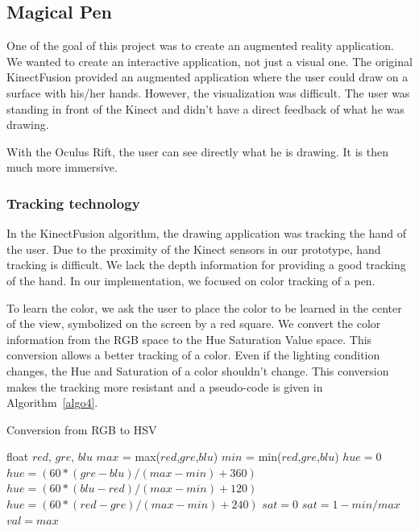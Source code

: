 \documentclass[12pt, twoside]{article}
\begin{document}
\subsection{Magical Pen}
One of the goal of this project was to create an augmented reality application. We wanted to create an interactive application, not just a visual one. The original KinectFusion provided an augmented application where the user could draw on a surface with his/her hands. However, the visualization was difficult. The user was standing in front of the Kinect and didn't have a direct feedback of what he was drawing.

With the Oculus Rift, the user can see directly what he is drawing. It is then much more immersive.

\subsubsection{Tracking technology}
In the KinectFusion algorithm, the drawing application was tracking the hand of the user. Due to the proximity of the Kinect sensors in our prototype, hand tracking is difficult. We lack the depth information for providing a good tracking of the hand. In our implementation, we focused on color tracking of a pen.

To learn the color, we ask the user to place the color to be learned in the center of the view, symbolized on the screen by a red square. We convert the color information from the RGB space to the Hue Saturation Value space. This conversion allows a better tracking of a color. Even if the lighting condition changes, the Hue and Saturation of a color shouldn't change. This conversion makes the tracking more resistant and a pseudo-code is given in Algorithm~\ref{algo4}.

\begin{algorithm}
\caption{Conversion from RGB to HSV}\label{algo4}
\begin{algorithmic}[1]
\State float $red$, $gre$, $blu$
\State $max$ = max($red$,$gre$,$blu$)
\State $min$ = min($red$,$gre$,$blu$)
  \State $hue = 0$
  \State $hue = (60*(gre-blu)/(max-min) + 360)$
  \EndIf
{}
  \State $hue = (60*(blu-red)/(max-min) + 120)$
\Else
  \State $hue = (60*(red-gre)/(max-min) + 240)$
\EndIf
{}
  \State $sat = 0$
\Else
  \State $sat = 1-min/max$
\EndIf
\State $val = max$
\end{algorithmic}
\end{algorithm}
\end{document}
